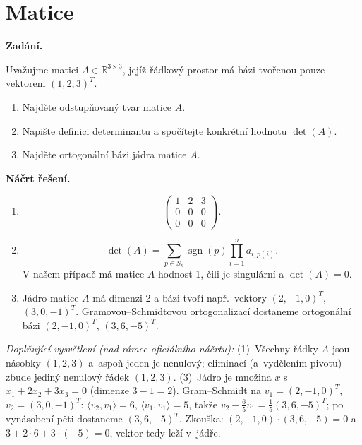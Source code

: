 \section{Matice}

\noindent\textbf{Zadání.}\par
Uvažujme matici $A \in \mathbb{R}^{3 \times 3}$, jejíž řádkový prostor má bázi tvořenou pouze vektorem $(1,2,3)^T$.
\begin{enumerate}
  \item Najděte odstupňovaný tvar matice $A$.
  \item Napište definici determinantu a spočítejte konkrétní hodnotu $\det(A)$.
  \item Najděte ortogonální bázi jádra matice $A$.
\end{enumerate}

\medskip
\noindent\textbf{Náčrt řešení.}\par
\begin{enumerate}
  \item
    \[
      \begin{pmatrix}
        1 & 2 & 3 \\
        0 & 0 & 0 \\
        0 & 0 & 0
      \end{pmatrix}.
    \]
  \item
    \[
      \det(A) = \sum_{p \in S_n} \operatorname{sgn}(p) \prod_{i=1}^{n} a_{i,p(i)}.
    \]
    V našem případě má matice $A$ hodnost 1, čili je singulární a $\det(A) = 0$.
  \item Jádro matice $A$ má dimenzi 2 a bázi tvoří např.\ vektory $(2,-1,0)^T$, $(3,0,-1)^T$. Gramovou--Schmidtovou ortogonalizací dostaneme ortogonální bázi $(2,-1,0)^T$, $(3,6,-5)^T$.
\end{enumerate}

\medskip
\noindent\textit{Doplňující vysvětlení (nad rámec oficiálního náčrtu):} (1)~Všechny řádky $A$ jsou násobky $(1,2,3)$ a~aspoň jeden je nenulový; eliminací (a~vydělením pivotu) zbude jediný nenulový řádek $(1,2,3)$. (3)~Jádro je množina $x$ s~$x_1+2x_2+3x_3=0$ (dimenze $3-1=2$). Gram--Schmidt na $v_1=(2,-1,0)^T$, $v_2=(3,0,-1)^T$: $\langle v_2,v_1\rangle=6$, $\langle v_1,v_1\rangle=5$, takže $v_2-\tfrac65v_1=\tfrac15(3,6,-5)^T$; po vynásobení pěti dostaneme $(3,6,-5)^T$. Zkouška: $(2,-1,0)\cdot(3,6,-5)=0$ a~$3+2\cdot6+3\cdot(-5)=0$, vektor tedy leží v~jádře.
